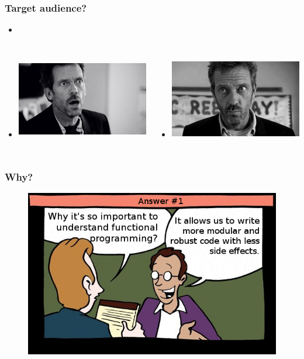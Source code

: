 \documentclass[18pt, compress]{beamer}
\begin{document}
\begin{frame}[fragile]
    \frametitle{Target audience?}
    \begin{itemize}[leftmargin=*]
        \item <+->
    \end{itemize}

    \vspace{-40pt}

    \begin{columns}[T,onlytextwidth]
    \begin{itemize}[leftmargin=*]
        \item <+->\includegraphics[width=6cm,height=3.5cm]{house1.jpeg}
    \end{itemize}

    \vspace{20pt}

    \begin{itemize}[leftmargin=*]
        \item <+->\includegraphics[width=6cm,height=3.5cm]{house2.png}
    \end{itemize}
    \end{columns}
\end{frame}

\begin{frame}
    \frametitle{Why?}
    \vspace{-15pt}
    \begin{figure}
        \includegraphics[width=1.0\textwidth,center]{first_option.png}
    \end{figure}
\end{frame}
\end{document}
